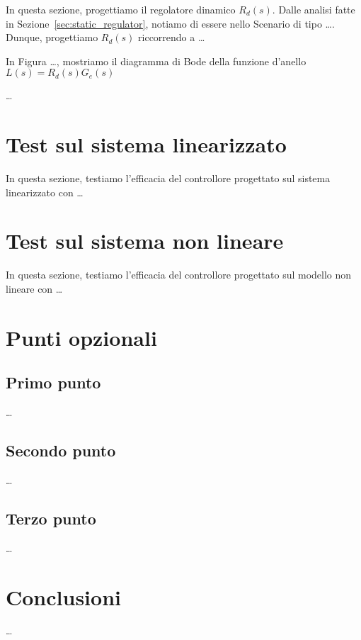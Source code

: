 \documentclass[a4paper, 11pt]{article}
\begin{document}
In questa sezione, progettiamo il regolatore dinamico $R_d(s)$. 
%
Dalle analisi fatte in Sezione~\ref{sec:static_regulator}, notiamo di essere nello Scenario di tipo \dots. Dunque, progettiamo $R_d(s)$ riccorrendo a \dots


In Figura \dots, mostriamo il diagramma di Bode della funzione d'anello $L(s) = R_d(s) G_e(s)$

\dots

\section{Test sul sistema linearizzato}

In questa sezione, testiamo l'efficacia del controllore progettato sul sistema linearizzato con \dots

\section{Test sul sistema non lineare}

In questa sezione, testiamo l'efficacia del controllore progettato sul modello non lineare con \dots


\section{Punti opzionali}

\subsection{Primo punto}

\dots 

\subsection{Secondo punto}

\dots

\subsection{Terzo punto}

\dots

\section{Conclusioni}

\dots
\end{document}
